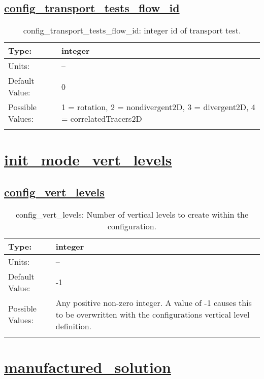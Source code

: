 \subsection[config\_transport\_tests\_flow\_id]{\hyperref[sec:nm_tab_transport_tests]{config\_transport\_tests\_flow\_id}}
\label{subsec:nm_sec_config_transport_tests_flow_id}
\begin{center}
\begin{longtable}{| p{2.0in} || p{4.0in} |}
    \hline
    Type: & integer \\
    \hline
    Units: & -- \\
    \hline
    Default Value: & 0 \\
    \hline
    Possible Values: & 1 = rotation, 2 = nondivergent2D, 3 = divergent2D, 4 = correlatedTracers2D \\
    \hline
    \caption{config\_transport\_tests\_flow\_id: integer id of transport test.}
\end{longtable}
\end{center}
\section[init\_mode\_vert\_levels]{\hyperref[sec:nm_tab_init_mode_vert_levels]{init\_mode\_vert\_levels}}
\label{sec:nm_sec_init_mode_vert_levels}
\subsection[config\_vert\_levels]{\hyperref[sec:nm_tab_init_mode_vert_levels]{config\_vert\_levels}}
\label{subsec:nm_sec_config_vert_levels}
\begin{center}
\begin{longtable}{| p{2.0in} || p{4.0in} |}
    \hline
    Type: & integer \\
    \hline
    Units: & -- \\
    \hline
    Default Value: & -1 \\
    \hline
    Possible Values: & Any positive non-zero integer. A value of -1 causes this to be overwritten with the configurations vertical level definition. \\
    \hline
    \caption{config\_vert\_levels: Number of vertical levels to create within the configuration.}
\end{longtable}
\end{center}
\section[manufactured\_solution]{\hyperref[sec:nm_tab_manufactured_solution]{manufactured\_solution}}
\label{sec:nm_sec_manufactured_solution}
